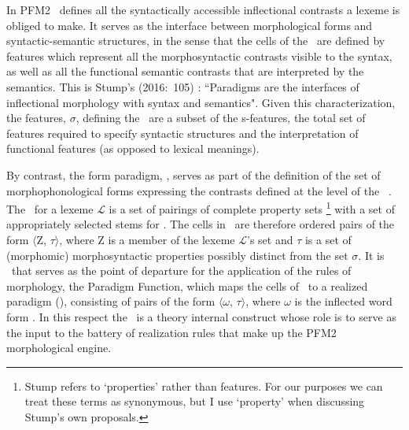 \documentclass[output=paper,colorlinks,citecolor=brown]{langscibook}
\begin{document}
In PFM2 \PC\ defines all the syntactically accessible inflectional contrasts a lexeme is obliged to make. %
It serves as the interface between morphological forms and syntactic-semantic structures, in the sense that the cells of the \PC\ are defined by features which represent all the morphosyntactic contrasts visible to the syntax, as well as all the functional semantic contrasts that are interpreted by the semantics. This is Stump's \mbox{(2016: 105)} \textit{}: ``Paradigms are the interfaces of inflectional morphology with syntax and semantics". %
Given this characterization,  the features, $\sigma$, defining the \PC\ are a subset of the s-features, the total set of features required to specify syntactic structures and the interpretation of functional features (as opposed to lexical meanings). 

By contrast, the form paradigm, \PF, serves as part of the definition of  the set of morphophonological forms expressing the contrasts defined at the level of the \PC\ \citep[106]{stump2016}. The \PF\ for a lexeme $\mathcal{L}$ is a set of pairings of complete property sets%
\footnote{%
	Stump refers to `properties' rather than features. For our purposes we can treat these terms as synonymous, but I use `property' when discussing Stump's own proposals.
} %
with a set of appropriately selected stems for \lex.  The cells in   \PF\ are therefore ordered pairs  of the form $\langle$Z, $\tau$$\rangle$, 
where Z is a member of the lexeme $\mathcal{L}$’s  set    and $\tau$ is a set of (morphomic) morphosyntactic properties possibly distinct from the set $\sigma$. It is \PF\ that serves as the point of departure for the application of the  rules of morphology, the Paradigm Function, which  maps the cells of \PF\  to a realized paradigm (\PR), consisting of pairs of the form   $\langle$$\omega$, $\tau$$\rangle$, where $\omega$ is the inflected word form \citep[or a set of word forms in the case of ,][]{thornton2012}. In this respect the \PF\ is a theory internal construct whose role is to serve as the input to the battery of realization rules that make up the PFM2 morphological engine. 
\end{document}

